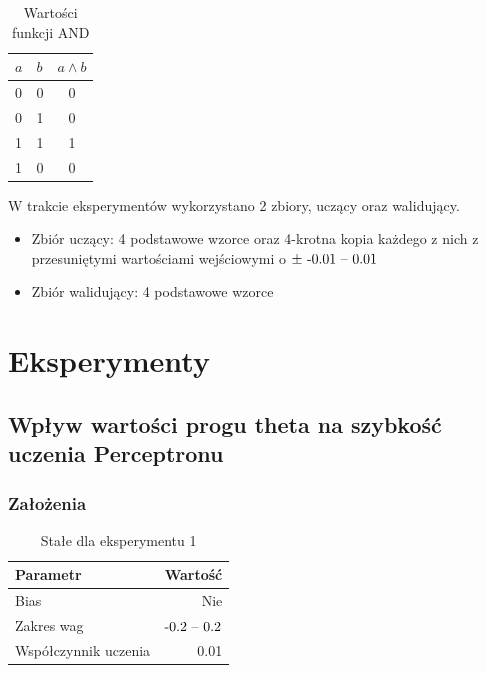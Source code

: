 \documentclass{article}
\begin{document}
\begin{table}[!h]
	\caption{Wartości funkcji AND}
	\label{tabela-and}
	\centering
	\begin{tabular}{llc}
		\toprule
		\(a\) & \(b\) & \(a \land b\) \\
		\midrule
		0     & 0     & 0             \\
		0     & 1     & 0             \\
		1     & 1     & 1             \\
		1     & 0     & 0             \\
		\bottomrule
	\end{tabular}
\end{table}

W trakcie eksperymentów wykorzystano 2 zbiory, uczący oraz walidujący.
\begin{itemize}
	\item Zbiór uczący: 4 podstawowe wzorce oraz 4-krotna kopia każdego z nich z przesuniętymi wartościami wejściowymi o \(\pm\ $-0.01 -- 0.01$\)
	\item Zbiór walidujący: 4 podstawowe wzorce
\end{itemize}

\newpage
\section{Eksperymenty}

\subsection{Wpływ wartości progu theta na szybkość uczenia Perceptronu}
\subsubsection*{Założenia}
\begin{table}[!h]
	\caption{Stałe dla eksperymentu 1}
	\label{tabela-const-1}
	\centering
	\begin{tabular}{lr}
		\toprule
		Parametr               & Wartość         \\
		\midrule
		Bias                   & Nie               \\
		Zakres wag             & \($-0.2 -- 0.2$\) \\
		Współczynnik uczenia & 0.01              \\
		\bottomrule
	\end{tabular}
\end{table}
\end{document}
